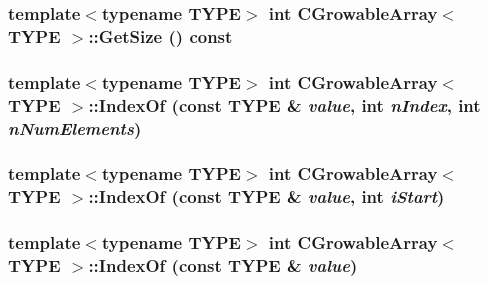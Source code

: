 \label{class_c_growable_array_ab3d75c2f7eca8b3c49f63932bd8ae5bb}
\hypertarget{class_c_growable_array_ab8be085b33e3698b96dacfa8bcb5f7ee}{
\subsubsection[{GetSize}]{\setlength{\rightskip}{0pt plus 5cm}template$<$typename TYPE$>$ {\bf int} {\bf CGrowableArray}$<$ TYPE $>$::GetSize () const}}
\label{class_c_growable_array_ab8be085b33e3698b96dacfa8bcb5f7ee}
\hypertarget{class_c_growable_array_a85097aa77eaee15de0d8184bff5899f9}{
\subsubsection[{IndexOf}]{\setlength{\rightskip}{0pt plus 5cm}template$<$typename TYPE$>$ {\bf int} {\bf CGrowableArray}$<$ TYPE $>$::IndexOf (const TYPE \& {\em value}, \/  {\bf int} {\em nIndex}, \/  {\bf int} {\em nNumElements})}}
\label{class_c_growable_array_a85097aa77eaee15de0d8184bff5899f9}
\hypertarget{class_c_growable_array_a0a9c399665f3901d6c949f4f4f334208}{
\subsubsection[{IndexOf}]{\setlength{\rightskip}{0pt plus 5cm}template$<$typename TYPE$>$ {\bf int} {\bf CGrowableArray}$<$ TYPE $>$::IndexOf (const TYPE \& {\em value}, \/  {\bf int} {\em iStart})}}
\label{class_c_growable_array_a0a9c399665f3901d6c949f4f4f334208}
\hypertarget{class_c_growable_array_a25e5e002fc8960491e350861d690c76b}{
\subsubsection[{IndexOf}]{\setlength{\rightskip}{0pt plus 5cm}template$<$typename TYPE$>$ {\bf int} {\bf CGrowableArray}$<$ TYPE $>$::IndexOf (const TYPE \& {\em value})}}
